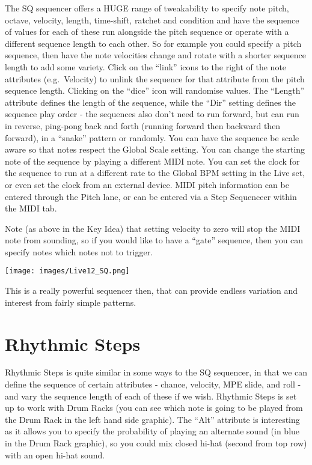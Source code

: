 \documentclass[
  12pt,
  letterpaper,
  oneside,
  open=any]{scrbook}
\begin{document}
The SQ sequencer offers a HUGE range of tweakability to specify note
pitch, octave, velocity, length, time-shift, ratchet and condition and
have the sequence of values for each of these run alongside the pitch
sequence or operate with a different sequence length to each other. So
for example you could specify a pitch sequence, then have the note
velocities change and rotate with a shorter sequence length to add some
variety. Click on the ``link'' icons to the right of the note attributes
(e.g.~Velocity) to unlink the sequence for that attribute from the pitch
sequence length. Clicking on the ``dice'' icon will randomise values.
The ``Length'' attribute defines the length of the sequence, while the
``Dir'' setting defines the sequence play order - the sequences also
don't need to run forward, but can run in reverse, ping-pong back and
forth (running forward then backward then forward), in a ``snake''
pattern or randomly. You can have the sequence be scale aware so that
notes respect the Global Scale setting. You can change the starting note
of the sequence by playing a different MIDI note. You can set the clock
for the sequence to run at a different rate to the Global BPM setting in
the Live set, or even set the clock from an external device. MIDI pitch
information can be entered through the Pitch lane, or can be entered via
a Step Sequenceer within the MIDI tab.

Note (as above in the Key Idea) that setting velocity to zero will stop
the MIDI note from sounding, so if you would like to have a ``gate''
sequence, then you can specify notes which notes not to trigger.

\texttt{[image: images/Live12\_SQ.png]}

This is a really powerful sequencer then, that can provide endless
variation and interest from fairly simple patterns.

\section{Rhythmic Steps}\label{rhythmic-steps}

Rhythmic Steps is quite similar in some ways to the SQ sequencer, in
that we can define the sequence of certain attributes - chance,
velocity, MPE slide, and roll - and vary the sequence length of each of
these if we wish. Rhythmic Steps is set up to work with Drum Racks (you
can see which note is going to be played from the Drum Rack in the left
hand side graphic). The ``Alt'' attribute is interesting as it allows
you to specify the probability of playing an alternate sound (in blue in
the Drum Rack graphic), so you could mix closed hi-hat (second from top
row) with an open hi-hat sound.
\end{document}
